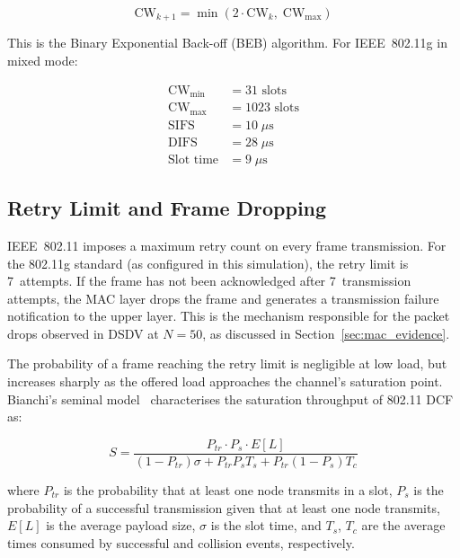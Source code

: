 \begin{equation}
  \text{CW}_{k+1} = \min\!\left(2 \cdot \text{CW}_k,\; \text{CW}_{\max}\right)
  \label{eq:beb}
\end{equation}

This is the Binary Exponential Back-off (BEB) algorithm. For IEEE~802.11g in mixed
mode:

\begin{align*}
  \text{CW}_{\min} &= 31 \text{ slots} \\
  \text{CW}_{\max} &= 1023 \text{ slots} \\
  \text{SIFS}       &= 10\;\mu\text{s} \\
  \text{DIFS}       &= 28\;\mu\text{s} \\
  \text{Slot time}  &= 9\;\mu\text{s}
\end{align*}

\subsection{Retry Limit and Frame Dropping}

IEEE~802.11 imposes a maximum retry count on every frame transmission. For the
802.11g standard (as configured in this simulation), the retry limit is 7~attempts. If
the frame has not been acknowledged after 7~transmission attempts, the MAC layer drops
the frame and generates a transmission failure notification to the upper layer. This is
the mechanism responsible for the packet drops observed in DSDV at $N = 50$, as
discussed in Section~\ref{sec:mac_evidence}.

The probability of a frame reaching the retry limit is negligible at low load, but
increases sharply as the offered load approaches the channel's saturation point.
Bianchi's seminal model~\cite{bianchi2000} characterises the saturation throughput of
802.11 DCF as:

\begin{equation}
  S = \frac{P_{tr} \cdot P_s \cdot E[L]}
         {(1 - P_{tr})\sigma + P_{tr}P_s T_s + P_{tr}(1-P_s)T_c}
  \label{eq:bianchi}
\end{equation}

where $P_{tr}$ is the probability that at least one node transmits in a slot, $P_s$ is
the probability of a successful transmission given that at least one node transmits,
$E[L]$ is the average payload size, $\sigma$ is the slot time, and $T_s$, $T_c$ are
the average times consumed by successful and collision events, respectively.

